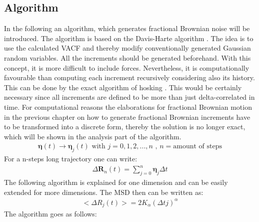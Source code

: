 \documentclass[
  a4paper,BCOR10mm,oneside,
  bibtotoc,idxtotoc,
  headsepline,footsepline,%
  fleqn,openbib
]{scrbook}
\begin{document}
\subsection{Algorithm}
In the following an algorithm, which generates fractional Brownian noise will be introduced. The algorithm is based on the Davis-Harte algorithm \cite{Craigmile2003}. The idea is to use the calculated VACF and thereby modify conventionally generated Gaussian random variables. All the increments should be generated beforehand. With this concept, it is more difficult to include forces. Nevertheless, it is computationally favourable than computing each increment recursively considering also its history. This can be done by the exact algorithm of hosking \cite{WRCR:WRCR3676}. This would be certainly necessary since all increments are defined to be more than just delta-correlated in time. For computational reasons the elaborations for fractional Brownian motion in the previous chapter on how to generate fractional Brownian increments have to be transformed into a discrete form, thereby the solution is no longer exact, which will be shown in the analysis part of the algorithm.  
\begin{align}
\bm{\eta} (t) \longrightarrow \bm{\eta}_j(t)  \text{  with  } j=0,1,2,...,n  \text{  ,  } n= \text{amount of steps}
\end{align}
For a n-steps long trajectory one can write:
\begin{align}
 \Delta \bm{R}_n(t) =  \sum_{j=0}^n \bm{\eta}_j  \Delta t \label{eq:diskretdeltar}
\end{align}
 The following algorithm is explained for one dimension and can be easily extended for more dimensions. The MSD then can be written as:
\begin{align}
< \Delta R_{j}(t)>=2K_{\alpha} (\Delta t j)^{\alpha}
\end{align}
The algorithm goes as follows:
\end{document}
